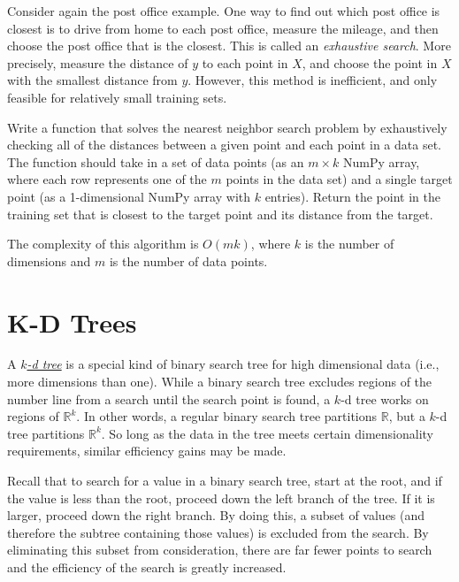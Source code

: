 Consider again the post office example.
One way to find out which post office is closest is to drive from home to each post office, measure the mileage, and then choose the post office that is the closest.
This is called an \emph{exhaustive search}.
More precisely, measure the distance of $y$ to each point in $X$, and choose the point in $X$ with the smallest distance from $y$.
However, this method is inefficient, and only feasible for relatively small training sets.

\begin{problem} %
Write a function that solves the nearest neighbor search problem by exhaustively checking all of the distances between a given point and each point in a data set.
The function should take in a set of data points (as an $m \times k$ NumPy array, where each row represents one of the $m$ points in the data set) and a single target point (as a 1-dimensional NumPy array with $k$ entries).
Return the point in the training set that is closest to the target point and its distance from the target.

The complexity of this algorithm is $O(mk)$, where $k$ is the number of dimensions and $m$ is the number of data points.
\end{problem}

\section*{K-D Trees} %

A \href{https://en.wikipedia.org/wiki/K-d_tree}{\emph{$k$-d tree}} is a special kind of binary search tree for high dimensional data (i.e., more dimensions than one).
While a binary search tree excludes regions of the number line from a search until the search point is found, a $k$-d tree works on regions of $\mathbb{R}^k$.
In other words, a regular binary search tree partitions $\mathbb{R}$, but a $k$-d tree partitions $\mathbb{R}^{k}$.
So long as the data in the tree meets certain dimensionality requirements, similar efficiency gains may be made.

Recall that to search for a value in a binary search tree, start at the root, and if the value is less than the root, proceed down the left branch of the tree.
If it is larger, proceed down the right branch.
By doing this, a subset of values (and therefore the subtree containing those values) is excluded from the search.
By eliminating this subset from consideration, there are far fewer points to search and the efficiency of the search is greatly increased.

